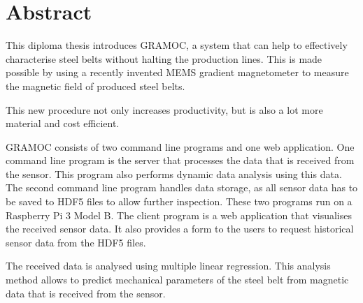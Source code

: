 \chapter{Abstract}

This diploma thesis introduces GRAMOC, a system that can help to effectively characterise steel belts without halting the production lines. This is made possible by using a recently invented MEMS gradient magnetometer to measure the magnetic field of produced steel belts.

This new procedure not only increases productivity, but is also a lot more material and cost efficient.

GRAMOC consists of two command line programs and one web application. One command line program is the server that processes the data that is received from the sensor. This program also performs dynamic data analysis using this data. The second command line program handles data storage, as all sensor data has to be saved to HDF5 files to allow further inspection. These two programs run on a Raspberry Pi 3 Model B. The client program is a web application that visualises the received sensor data. It also provides a form to the users to request historical sensor data from the HDF5 files.

The received data is analysed using multiple linear regression. This analysis method allows to predict mechanical parameters of the steel belt from magnetic data that is received from the sensor.

